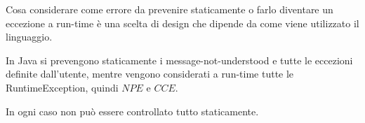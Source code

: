 Cosa considerare come errore da prevenire staticamente o farlo diventare un eccezione a run-time è una scelta di design che dipende da come viene utilizzato il linguaggio.

In Java si prevengono staticamente i message-not-understood e tutte le eccezioni definite dall'utente, mentre vengono considerati a run-time tutte le RuntimeException, quindi $NPE$ e $CCE$.

In ogni caso non può essere controllato tutto staticamente.























